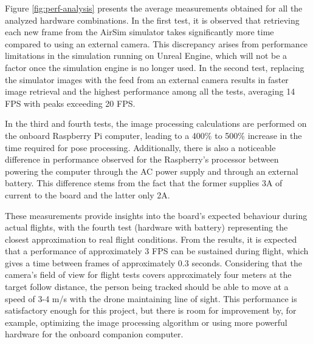 Figure \ref{fig:perf-analysis} presents the average measurements obtained for all the analyzed hardware combinations. In the first test, it is observed that retrieving each new frame from the AirSim simulator takes significantly more time compared to using an external camera. This discrepancy arises from performance limitations in the simulation running on Unreal Engine, which will not be a factor once the simulation engine is no longer used. In the second test, replacing the simulator images with the feed from an external camera results in faster image retrieval and the highest performance among all the tests, averaging 14 FPS with peaks exceeding 20 FPS.

In the third and fourth tests, the image processing calculations are performed on the onboard Raspberry Pi computer, leading to a 400\% to 500\% increase in the time required for pose processing. Additionally, there is also a noticeable difference in performance observed for the Raspberry's processor between powering the computer through the AC power supply and through an external battery. This difference stems from the fact that the former supplies 3A of current to the board and the latter only 2A.

These measurements provide insights into the board's expected behaviour during actual flights, with the fourth test (hardware with battery) representing the closest approximation to real flight conditions. From the results, it is expected that a performance of approximately 3 FPS can be sustained during flight, which gives a time between frames of approximately 0.3 seconds. Considering that the camera's field of view for flight tests covers approximately four meters at the target follow distance, the person being tracked should be able to move at a speed of 3-4 m/s with the drone maintaining line of sight. This performance is satisfactory enough for this project, but there is room for improvement by, for example, optimizing the image processing algorithm or using more powerful hardware for the onboard companion computer.
